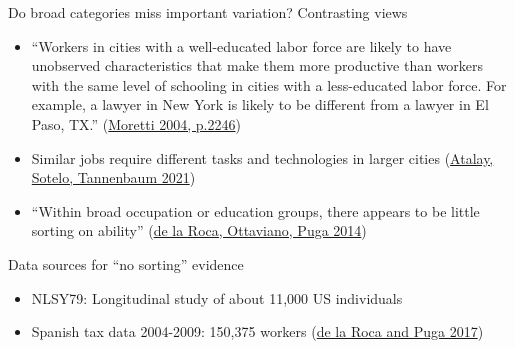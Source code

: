 \documentclass[10pt,notes=hide]{beamer}
\begin{document}
\begin{frame}{Do broad categories miss important variation?}
Contrasting views
\begin{itemize}
	\item  ``Workers in cities with a well-educated labor force are likely to have unobserved characteristics that make them more productive than workers with the same level of schooling in cities with a less-educated labor force. For example, a lawyer in New York is likely to be different from a lawyer in El Paso, TX.'' (\href{https://ideas.repec.org/h/eee/regchp/4-51.html}{Moretti 2004, p.2246})
	\item[] {\small Similar jobs require different tasks and technologies in larger cities (\href{http://www-personal.umich.edu/~ssotelo/research/AST_geography.pdf}{Atalay, Sotelo, Tannenbaum 2021})}
	\item ``Within broad occupation or education groups, there appears to be little sorting on ability'' (\href{http://diegopuga.org/research/dreams.pdf}{de la Roca, Ottaviano, Puga 2014})
\end{itemize}
Data sources for ``no sorting'' evidence
\begin{itemize}
	\item NLSY79: Longitudinal study of about 11,000 US individuals
	\item Spanish tax data 2004-2009: 150,375 workers (\href{https://academic.oup.com/restud/article/84/1/106/2669971}{de la Roca and Puga 2017})
\end{itemize}
\end{frame}
\end{document}
